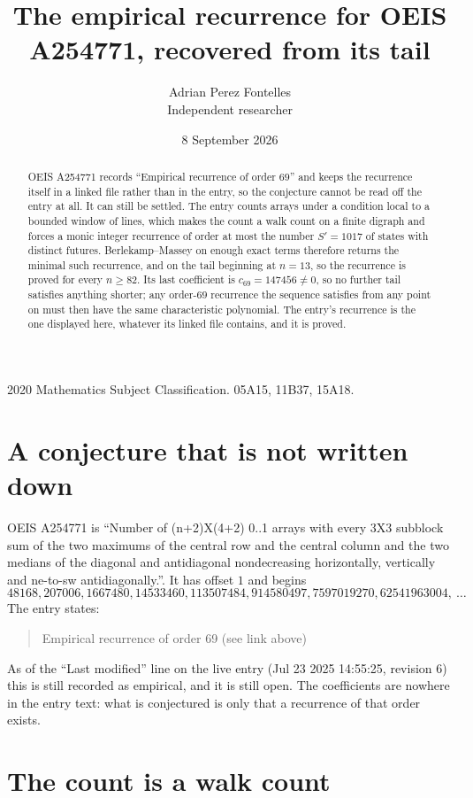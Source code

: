 \documentclass[11pt,a4paper]{article}
\title{The empirical recurrence for OEIS A254771, recovered from its tail}
\author{Adrian Perez Fontelles\\ \small Independent researcher}
\date{8 September 2026}
\theoremstyle{plain}
\theoremstyle{definition}
\begin{document}
\maketitle

\begin{abstract}
OEIS A254771 records ``Empirical recurrence of order $69$'' and keeps the recurrence itself in
a linked file rather than in the entry, so the conjecture cannot be read off the entry at all.
It can still be settled. The entry counts arrays under a condition local to a bounded window of
lines, which makes the count a walk count on a finite digraph and forces a monic integer
recurrence of order at most the number $S'=1017$ of states with distinct futures. Berlekamp--Massey on
enough exact terms therefore returns the minimal such recurrence, and on the tail beginning at $n=13$, so the recurrence is proved for every $n\ge82$.
Its last coefficient is $c_{69}=147456\neq0$, so no further tail satisfies anything
shorter; any order-$69$ recurrence the sequence satisfies from any point on must then have
the same characteristic polynomial. The entry's recurrence is the one displayed here, whatever
its linked file contains, and it is proved.
\end{abstract}

\noindent\small 2020 Mathematics Subject Classification. 05A15, 11B37, 15A18.\normalsize

\section{A conjecture that is not written down}

OEIS A254771 is ``Number of (n+2)X(4+2) 0..1 arrays with every 3X3 subblock sum of the two maximums of the central row and the central column and the two medians of the diagonal and antidiagonal nondecreasing horizontally, vertically and ne-to-sw antidiagonally.''. It has offset $1$ and begins
\[
48168, 207006, 1667480, 14533460, 113507484, 914580497, 7597019270, 62541963004,\ \dots
\]
The entry states:
\begin{quote}
Empirical recurrence of order 69 (see link above)
\end{quote}
As of the ``Last modified'' line on the live entry (Jul 23 2025 14:55:25, revision 6)
this is still recorded as empirical, and it is still open. The coefficients are nowhere in the
entry text: what is conjectured is only that a recurrence of that order exists.

\section{The count is a walk count}
\end{document}
